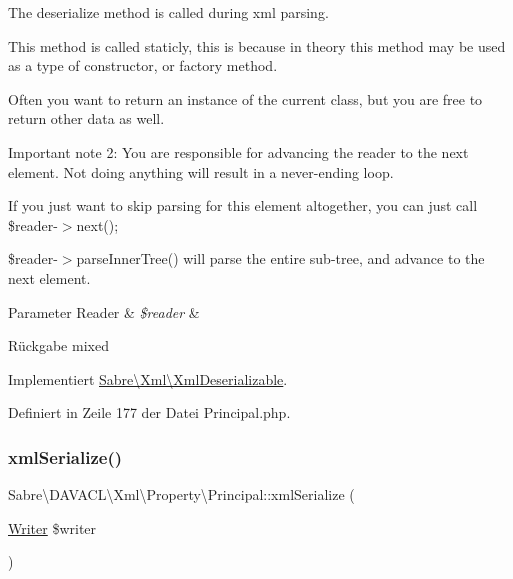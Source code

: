 The deserialize method is called during xml parsing.

This method is called staticly, this is because in theory this method may be used as a type of constructor, or factory method.

Often you want to return an instance of the current class, but you are free to return other data as well.

Important note 2\+: You are responsible for advancing the reader to the next element. Not doing anything will result in a never-\/ending loop.

If you just want to skip parsing for this element altogether, you can just call \$reader-\/$>$next();

\$reader-\/$>$parse\+Inner\+Tree() will parse the entire sub-\/tree, and advance to the next element.


\begin{DoxyParams}[1]{Parameter}
Reader & {\em \$reader} & \\
\hline
\end{DoxyParams}
\begin{DoxyReturn}{Rückgabe}
mixed 
\end{DoxyReturn}


Implementiert \mbox{\hyperlink{interface_sabre_1_1_xml_1_1_xml_deserializable_a19e0eca545b9a0d93f7d6b69085ade30}{Sabre\textbackslash{}\+Xml\textbackslash{}\+Xml\+Deserializable}}.



Definiert in Zeile 177 der Datei Principal.\+php.

\mbox{\label{class_sabre_1_1_d_a_v_a_c_l_1_1_xml_1_1_property_1_1_principal_aeaa0152eca3d1706c56e30964c8f4ff3}} 
\subsubsection{\texorpdfstring{xml\+Serialize()}{xmlSerialize()}}
{\footnotesize\ttfamily Sabre\textbackslash{}\+D\+A\+V\+A\+C\+L\textbackslash{}\+Xml\textbackslash{}\+Property\textbackslash{}\+Principal\+::xml\+Serialize (\begin{DoxyParamCaption}\item[{\mbox{\hyperlink{class_sabre_1_1_xml_1_1_writer}{Writer}}}]{\$writer }\end{DoxyParamCaption})}

